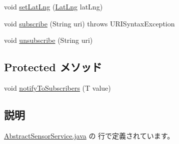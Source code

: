 \begin{DoxyCompactItemize}
\item 
void \hyperlink{classjp_1_1ac_1_1kyoto__u_1_1i_1_1soc_1_1ai_1_1iostbase_1_1service_1_1iot_1_1_abstract_sensor_service_3_01_t_01_4_a2207577d097d0647e7762240102fb387}{set\-Lat\-Lng} (\hyperlink{classjp_1_1ac_1_1kyoto__u_1_1i_1_1soc_1_1ai_1_1iostbase_1_1service_1_1intf_1_1_lat_lng}{Lat\-Lng} lat\-Lng)
\item 
void \hyperlink{classjp_1_1ac_1_1kyoto__u_1_1i_1_1soc_1_1ai_1_1iostbase_1_1service_1_1iot_1_1_abstract_sensor_service_3_01_t_01_4_ae33308b2c4808c4d19ea1c3347821c46}{subscribe} (String uri)  throws U\-R\-I\-Syntax\-Exception 
\item 
void \hyperlink{classjp_1_1ac_1_1kyoto__u_1_1i_1_1soc_1_1ai_1_1iostbase_1_1service_1_1iot_1_1_abstract_sensor_service_3_01_t_01_4_a4dfb830f1e18d663e93072ae301eed05}{unsubscribe} (String uri)
\end{DoxyCompactItemize}
\subsection*{Protected メソッド}
\begin{DoxyCompactItemize}
\item 
void \hyperlink{classjp_1_1ac_1_1kyoto__u_1_1i_1_1soc_1_1ai_1_1iostbase_1_1service_1_1iot_1_1_abstract_sensor_service_3_01_t_01_4_ae78894908f05db2479808c955c88a554}{notify\-To\-Subscribers} (T value)
\end{DoxyCompactItemize}


\subsection{説明}


 \hyperlink{_abstract_sensor_service_8java_source}{Abstract\-Sensor\-Service.\-java} の  行で定義されています。



